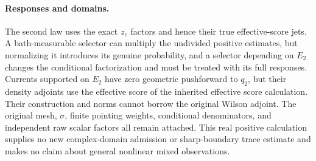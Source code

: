 \documentclass[11pt]{article}
\begin{document}
\paragraph{Responses and domains.}
The second law uses the exact $z_e$ factors and hence their true effective-score jets.
A bath-measurable selector can multiply the undivided positive estimates, but normalizing
it introduces its genuine probability, and a selector depending on $E_2$ changes the
conditional factorization and must be treated with its full responses.
Currents supported on $E_2$ have zero geometric pushforward to $q_2$, but their density
adjoints use the effective score of the inherited effective score calculation. Their construction and norms cannot borrow
the original Wilson adjoint. The original mesh, $\sigma$, finite pointing weights,
conditional denominators, and independent raw scalar factors all remain attached.
This real positive calculation supplies no new complex-domain admission or sharp-boundary
trace estimate and makes no claim about general nonlinear mixed observations.
\end{document}
